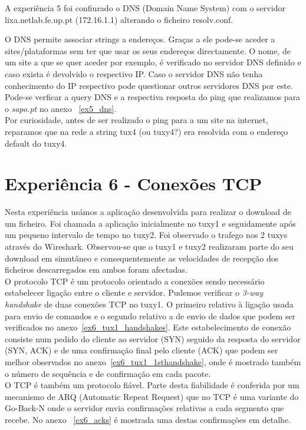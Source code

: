 \documentclass[11pt,a4paper,reqno]{report}
\numberwithin{equation}{section}
\begin{document}
A experiência 5 foi confiurado o DNS (Domain Name System) com o servidor lixa.netlab.fe.up.pt (172.16.1.1) alterando o ficheiro resolv.conf.

O DNS permite associar strings a endereços. Graças a ele pode-se aceder a sites/plataformas sem ter que usar os seus endereços directamente. O nome, de um site a que se quer aceder por exemplo, é verificado no servidor DNS definido e caso exista é devolvido o respectivo IP. Caso o servidor DNS não tenha conhecimento do IP respectivo pode questionar outros servidores DNS por este. \\

Pode-se verficar a query DNS e a respectiva resposta do ping que realizamos para o \emph{sapo.pt} no anexo ~\ref{ex5_dns}.\\

Por curiosidade, antes de ser realizado o ping para a um site na internet, reparamos que na rede a string tux4 (ou tuxy4?) era resolvida com o endereço default do tuxy4.

\section{Experiência 6 - Conexões TCP}

Nesta experiência usámos a aplicação desenvolvida para realizar o download de um ficheiro. Foi chamada a aplicação inicialmente no tuxy1 e seguidamente após um pequeno intervalo de tempo no tuxy2. Foi observado o trafego nos 2 tuxys através do Wireshark. Observou-se que o tuxy1 e tuxy2 realizaram parte do seu download em simutâneo e consequentemente as velocidades de recepção dos ficheiros descarregados em ambos foram afectadas.\\

O protocolo TCP é um protocolo orientado a conexões sendo necessário estabelecer ligação entre o cliente e servidor.
Pudemos verificar o \emph{3-way handshake} de duas conexões TCP no tuxy1. O primeiro relativo à ligação usada para envio de comandos e o segundo relativo a de envio de dados que podem ser verificados no anexo~\ref{ex6_tux1_handshakes}. Este estabelecimento de conexão consiste num pedido do cliente ao servidor (SYN) seguido da resposta do servidor (SYN, ACK) e de uma confirmação final pelo cliente (ACK) que podem ser melhor observados no anexo~\ref{ex6_tux1_1sthandshake}, onde é mostrado também o número de sequência e de confirmação em cada pacote. \\

O TCP é também um protocolo fiável. Parte desta fiabilidade é conferida por um mecanismo de ARQ (Automatic Repeat Request) que no TCP é uma variante do Go-Back-N onde o servidor envia confirmações relativas a cada segmento que recebe. No anexo ~\ref{ex6_acks} é mostrada uma destas confirmações em detalhe. \\
\end{document}
